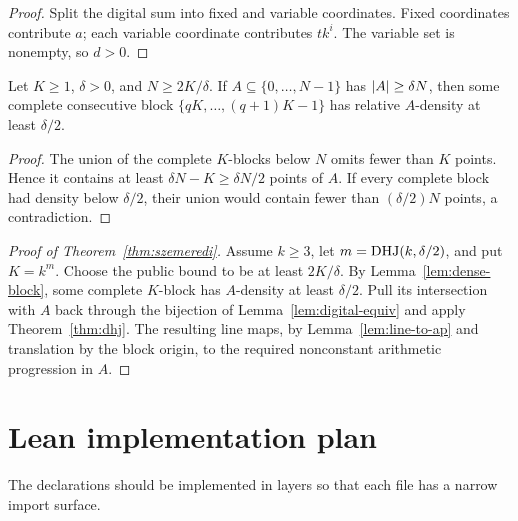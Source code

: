 \begin{proof}
Split the digital sum into fixed and variable coordinates.  Fixed coordinates contribute $a$;
each variable coordinate contributes $t k^i$.  The variable set is nonempty, so $d>0$.
\end{proof}

\begin{lemma}
\label{lem:dense-block}
Let $K\geq1$, $\delta>0$, and $N\geq2K/\delta$.  If
$A\subseteq\{0,\ldots,N-1\}$ has $\lvert A\rvert\geq\delta N$, then some complete consecutive block
$\{qK,\ldots,(q+1)K-1\}$ has relative $A$-density at least $\delta/2$.
\end{lemma}

\begin{proof}
The union of the complete $K$-blocks below $N$ omits fewer than $K$ points.  Hence it contains at
least $\delta N-K\geq\delta N/2$ points of $A$.  If every complete block had density below
$\delta/2$, their union would contain fewer than $(\delta/2)N$ points, a contradiction.
\end{proof}

\begin{proof}[Proof of Theorem~\ref{thm:szemeredi}]
Assume $k\geq3$, let $m=\operatorname{DHJ}(k,\delta/2)$, and put $K=k^m$.  Choose the public bound to be
at least $2K/\delta$.  By
Lemma~\ref{lem:dense-block}, some complete $K$-block has $A$-density at least $\delta/2$.
Pull its intersection with $A$ back through the bijection of Lemma~\ref{lem:digital-equiv} and
apply Theorem~\ref{thm:dhj}.  The resulting line maps, by Lemma~\ref{lem:line-to-ap} and translation
by the block origin, to the required nonconstant arithmetic progression in $A$.
\end{proof}


\chapter{Lean implementation plan}

The declarations should be implemented in layers so that each file has a narrow import surface.

